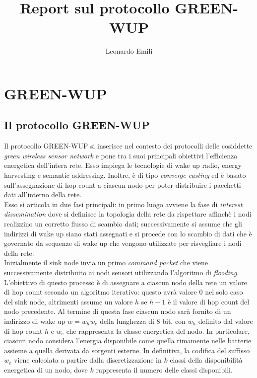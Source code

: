 \documentclass{report}
\title{Report sul protocollo GREEN-WUP}
\author{Leonardo Emili}
\begin{document}
\maketitle
\tableofcontents

\chapter{GREEN-WUP}
\section{Il protocollo GREEN-WUP}

Il protocollo GREEN-WUP si inserisce nel contesto dei protocolli delle cosiddette \emph{green wireless sensor network} e pone tra i suoi principali
obiettivi l'efficienza energetica dell'intera rete. Esso impiega le tecnologie di wake up radio, energy harvesting e semantic addressing. Inoltre, è
di tipo \emph{converge casting} ed è basato sull'assegnazione di hop count a ciascun nodo per poter distribuire i pacchetti dati
all'interno della rete.\\

Esso si articola in due fasi principali: in primo luogo avviene la fase di \emph{interest dissemination} dove si definisce la
topologia della rete da rispettare affinchè i nodi realizzino un corretto flusso di scambio dati; successivamente si assume che gli indirizzi di
wake up siano stati assegnati e si procede con lo scambio di dati che è governato da sequenze di wake up che vengono utilizzate per
risvegliare i nodi della rete.\\

Inizialmente il sink node invia un primo \emph{command packet} che viene successivamente distribuito ai nodi sensori utilizzando l'algoritmo di \emph{flooding}.
L'obiettivo di questo processo è di assegnare a ciascun nodo della rete un valore di hop count secondo un algoritmo iterativo: questo
avrà valore 0 nel solo caso del sink node, altrimenti assume un valore $h$ se $h-1$ è il valore di hop count del nodo precedente. Al termine
di questa fase ciascun nodo sarà fornito di un indirizzo di wake up $w=w_{h}w_{e}$ della lunghezza di 8 bit, con $w_{h}$ definito dal valore di hop
count $h$ e $w_{e}$ che rappresenta la classe energetica del nodo. In particolare, ciascun nodo considera
l'energia disponibile come quella rimamente nelle batterie assieme a quella derivata da sorgenti esterne. In definitiva, la codifica del suffisso $w_{e}$
viene calcolata a partire dalla discretizzazione in $k$ classi della disponibilità energetica di un nodo, dove $k$ rappresenta il numero delle classi
disponibili.\\
\end{document}

